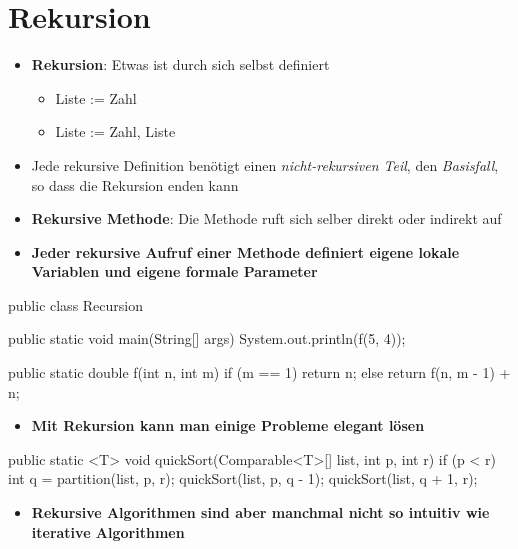 \documentclass[a4paper,10pt, dvipsnames]{report}
\begin{document}
\section{Rekursion}

\begin{itemize}
    \item \textbf{Rekursion}: Etwas ist durch sich selbst definiert
    \begin{itemize}
        \item Liste := Zahl
        \item Liste := Zahl, Liste
    \end{itemize}
    \item Jede rekursive Definition benötigt einen \textit{nicht-rekursiven Teil}, den \textit{Basisfall}, so dass die Rekursion enden kann
    \item \textbf{Rekursive Methode}: Die Methode ruft sich selber direkt oder indirekt auf
    \item \textbf{Jeder rekursive Aufruf einer Methode definiert eigene lokale Variablen und eigene formale Parameter}
\end{itemize}

\begin{javacodebox}
public class Recursion {
    public static void main(String[] args) {
        System.out.println(f(5, 4));
    }

    public static double f(int n, int m) {
        if (m == 1)
            return n;
        else
            return f(n, m - 1) + n;
    }
}
\end{javacodebox}


\begin{itemize}
    \item \textbf{Mit Rekursion kann man einige Probleme elegant lösen}
\end{itemize}

\begin{javacodebox}
public static <T> void quickSort(Comparable<T>[] list, int p, int r) {
    if (p < r) {
        int q = partition(list, p, r);
        quickSort(list, p, q - 1);
        quickSort(list, q + 1, r);
    }
}
\end{javacodebox}

\begin{itemize}
    \item \textbf{Rekursive Algorithmen sind aber manchmal nicht so intuitiv wie iterative Algorithmen}
\end{itemize}
\end{document}
